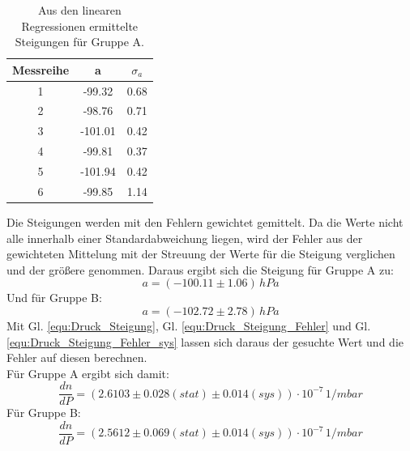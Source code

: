 \documentclass[12pt,a4paper]{article}
\begin{document}
\begin{table}
\begin{center}
\begin{tabular}{|c|c|c|}
\hline 
Messreihe & a & $\sigma _a$ \\ 
\hline 
1 & -99.32 & 0.68 \\ 
\hline 
2 & -98.76 & 0.71 \\ 
\hline 
3 & -101.01 & 0.42 \\ 
\hline 
4 & -99.81 & 0.37 \\ 
\hline 
5 & -101.94 & 0.42 \\ 
\hline 
6 & -99.85 & 1.14 \\  
\hline 
\end{tabular} 
\caption{Aus den linearen Regressionen ermittelte Steigungen für Gruppe A.}
\label{tab:Druck_Steigungen_A}
\end{center}
\end{table}

Die Steigungen werden mit den Fehlern gewichtet gemittelt. Da die Werte nicht alle innerhalb einer Standardabweichung liegen, wird der Fehler aus der gewichteten Mittelung mit der Streuung der Werte für die Steigung verglichen und der größere genommen. Daraus ergibt sich die Steigung für Gruppe A zu:
\begin{equation*}
a = (-100.11 \pm 1.06) \, \si{hPa}
\end{equation*}
Und für Gruppe B:
\begin{equation*}
a = (-102.72 \pm 2.78) \, \si{hPa}
\end{equation*}
Mit Gl. \ref{equ:Druck_Steigung}, Gl. \ref{equ:Druck_Steigung_Fehler} und Gl. \ref{equ:Druck_Steigung_Fehler_sys} lassen sich daraus der gesuchte Wert und die Fehler auf diesen berechnen. \\
Für Gruppe A ergibt sich damit:
\begin{equation*}
\dfrac{dn}{dP} = (2.6103 \pm 0.028 (stat) \pm 0.014 (sys)) \cdot 10^{-7} \, \si{1/mbar}  
\end{equation*}
Für Gruppe B:
\begin{equation*}
\dfrac{dn}{dP} = (2.5612 \pm 0.069 (stat) \pm 0.014 (sys)) \cdot 10^{-7} \, \si{1/mbar}
\end{equation*}
\end{document}
